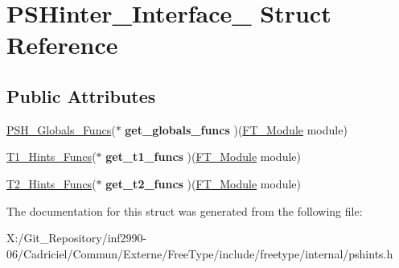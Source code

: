 \hypertarget{struct_p_s_hinter___interface__}{\section{P\-S\-Hinter\-\_\-\-Interface\-\_\- Struct Reference}
\label{struct_p_s_hinter___interface__}
}
\subsection*{Public Attributes}
\begin{DoxyCompactItemize}
\item 
\hypertarget{struct_p_s_hinter___interface___a59c68da021c7c0fadcb8bcc8c9a5ba75}{\hyperlink{struct_p_s_h___globals___funcs_rec__}{P\-S\-H\-\_\-\-Globals\-\_\-\-Funcs}($\ast$ {\bfseries get\-\_\-globals\-\_\-funcs} )(\hyperlink{struct_f_t___module_rec__}{F\-T\-\_\-\-Module} module)}\label{struct_p_s_hinter___interface___a59c68da021c7c0fadcb8bcc8c9a5ba75}

\item 
\hypertarget{struct_p_s_hinter___interface___a9b5405d780efc53df42c3a3e4f8e844b}{\hyperlink{struct_t1___hints___funcs_rec__}{T1\-\_\-\-Hints\-\_\-\-Funcs}($\ast$ {\bfseries get\-\_\-t1\-\_\-funcs} )(\hyperlink{struct_f_t___module_rec__}{F\-T\-\_\-\-Module} module)}\label{struct_p_s_hinter___interface___a9b5405d780efc53df42c3a3e4f8e844b}

\item 
\hypertarget{struct_p_s_hinter___interface___a7ecbd2179450d996111ec51e8d50ecc3}{\hyperlink{struct_t2___hints___funcs_rec__}{T2\-\_\-\-Hints\-\_\-\-Funcs}($\ast$ {\bfseries get\-\_\-t2\-\_\-funcs} )(\hyperlink{struct_f_t___module_rec__}{F\-T\-\_\-\-Module} module)}\label{struct_p_s_hinter___interface___a7ecbd2179450d996111ec51e8d50ecc3}

\end{DoxyCompactItemize}


The documentation for this struct was generated from the following file\-:\begin{DoxyCompactItemize}
\item 
X\-:/\-Git\-\_\-\-Repository/inf2990-\/06/\-Cadriciel/\-Commun/\-Externe/\-Free\-Type/include/freetype/internal/pshints.\-h\end{DoxyCompactItemize}
